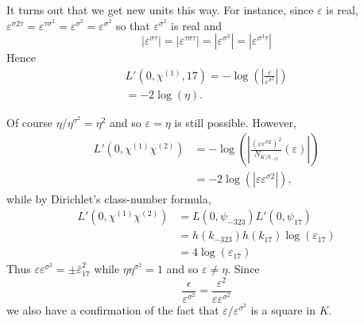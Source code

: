 It turns out that we get new units this way. For instance, since $\varepsilon$ is real, $\varepsilon^{\sigma 2 \tau} = \varepsilon^{\tau \sigma^2} = \varepsilon^{\sigma^2} = \varepsilon^{\sigma^2}$ so that $\varepsilon^{\sigma^2}$ is real and
$$
|\varepsilon^{\sigma \tau}| = |\varepsilon^{\tau \sigma \tau}| = |\varepsilon^{\sigma^3}| = |\varepsilon^{\sigma^3 \tau}|
$$
Hence 
\begin{gather*}
L'(0, \chi^{(1)}, 17) = - \log \left(\left|\frac{\varepsilon}{\varepsilon^{\sigma^2}} \right| \right)\\
 = -2 \log (\eta). 
\end{gather*} 

Of course $\eta/ \eta^{\sigma^2} = \eta^2$ and so $\varepsilon =\eta$ is still possible. However, 
\begin{align*}
L'(0, \chi^{(1)} \chi^{(2)}) & = - \log \left(\left|\frac{(\varepsilon \varepsilon^{\sigma 2})^2}{N_{K/k_{-19}}} (\varepsilon) \right| \right)\\
& = - 2 \log (|\varepsilon \varepsilon^{\sigma 2}|),
\end{align*}
while by Dirichlet's class-number formula, 
\begin{align*}
L'(0, \chi^{(1)} \chi^{(2)}) & = L (0, \psi_{-323}) L' (0, \psi_{17})\\
& = h (k_{-323}) h (k_{17}) \log(\varepsilon_{17})\\
& = 4 \log (\varepsilon_{17})
\end{align*}
Thus $\varepsilon \varepsilon^{\sigma^2} = \pm \bar{\varepsilon}^2_{17}$ while $\eta\eta^{\sigma^2} =1$ and so $\varepsilon \neq \eta$. Since 
$$
\frac{\epsilon}{\varepsilon^{\sigma^2}} = \frac{\varepsilon^2}{\varepsilon \varepsilon^{\sigma^2}}
$$
we also have a confirmation of the fact that $\varepsilon/ \varepsilon^{\sigma^2}$ is a square in $K$.

